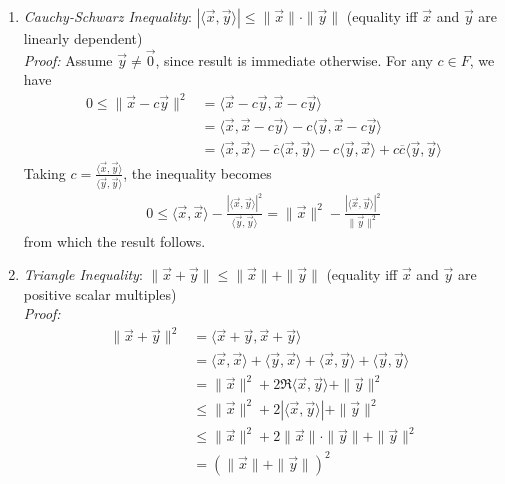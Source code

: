 \documentclass[10pt]{article}
\begin{document}
\begin{multicols*}{2}
\begin{enumerate}
\begin{enumerate}
        \item \textit{Cauchy-Schwarz Inequality}: $| \langle \vec{x}, \vec{y} \rangle | \leq \| \vec{x} \| \cdot \| \vec{y} \|$ (equality iff $\vec{x}$ and $\vec{y}$ are linearly dependent)\\ \textit{Proof:} Assume $\vec{y} \neq \vec{0}$, since result is immediate otherwise. For any $c \in F$, we have
        \begin{align*}
            0 \leq \| \vec{x} - c\vec{y} \|^2 
            &= \langle \vec{x} - c\vec{y}, \vec{x} - c\vec{y} \rangle \\
            &= \langle \vec{x}, \vec{x} - c\vec{y} \rangle -c \langle\vec{y}, \vec{x} -c\vec{y} \rangle \\
            &= \langle \vec{x}, \vec{x} \rangle - \overline{c} \langle \vec{x}, \vec{y} \rangle - c \langle \vec{y}, \vec{x} \rangle + c\overline{c} \langle \vec{y}, \vec{y} \rangle
        \end{align*}
        Taking $c = \frac{\langle \vec{x}, \vec{y} \rangle}{\langle \vec{y}, \vec{y} \rangle}$, the inequality becomes 
        \begin{align*}
            0 \leq \langle \vec{x}, \vec{x} \rangle - \frac{| \langle \vec{x}, \vec{y} \rangle |^2}{\langle \vec{y}, \vec{y} \rangle} = \| \vec{x} \|^2 - \frac{| \langle \vec{x}, \vec{y} \rangle |^2}{\| \vec{y} \|^2}
        \end{align*}
        from which the result follows.
        
        \item \textit{Triangle Inequality}: $\| \vec{x} + \vec{y} \| \leq \| \vec{x} \| + \| \vec{y} \|$
        (equality iff $\vec{x}$ and $\vec{y}$ are positive scalar multiples)\\ \textit{Proof:}
        \begin{align*}
            \| \vec{x} + \vec{y} \|^2 
            &= \langle \vec{x} + \vec{y}, \vec{x} + \vec{y} \rangle \\
            &= \langle \vec{x}, \vec{x} \rangle + \langle \vec{y}, \vec{x} \rangle + \langle \vec{x}, \vec{y} \rangle + \langle \vec{y}, \vec{y} \rangle \\
            &= \| \vec{x} \|^2 + 2\Re \langle \vec{x}, \vec{y} \rangle + \| \vec{y} \|^2 \\
            &\leq \| \vec{x} \|^2 + 2 | \langle \vec{x}, \vec{y} \rangle | + \| \vec{y} \|^2 \\
            &\leq \| \vec{x} \|^2 + 2 \| \vec{x} \| \cdot \| \vec{y} \| + \| \vec{y} \|^2 \\
            &= (\| \vec{x} \| + \| \vec{y} \|)^2
        \end{align*}
        

\end{enumerate}
\end{enumerate}
\end{multicols*}
\end{document}
